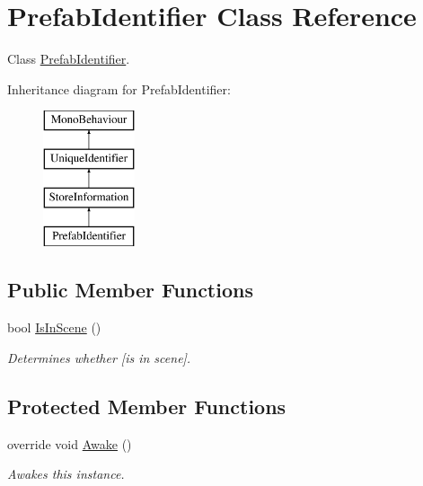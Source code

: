 \hypertarget{class_prefab_identifier}{}\section{Prefab\+Identifier Class Reference}
\label{class_prefab_identifier}


Class \hyperlink{class_prefab_identifier}{Prefab\+Identifier}.  


Inheritance diagram for Prefab\+Identifier\+:\begin{figure}[H]
\begin{center}
\leavevmode
\includegraphics[height=4.000000cm]{class_prefab_identifier}
\end{center}
\end{figure}
\subsection*{Public Member Functions}
\begin{DoxyCompactItemize}
\item 
bool \hyperlink{class_prefab_identifier_a30cb15dcd8a3f8ed5395a753b3ae9926}{Is\+In\+Scene} ()
\begin{DoxyCompactList}\small\item\em Determines whether \mbox{[}is in scene\mbox{]}. \end{DoxyCompactList}\end{DoxyCompactItemize}
\subsection*{Protected Member Functions}
\begin{DoxyCompactItemize}
\item 
override void \hyperlink{class_prefab_identifier_a851c02d913a5941dfbd1a472f3b3d6f3}{Awake} ()
\begin{DoxyCompactList}\small\item\em Awakes this instance. \end{DoxyCompactList}\end{DoxyCompactItemize}
